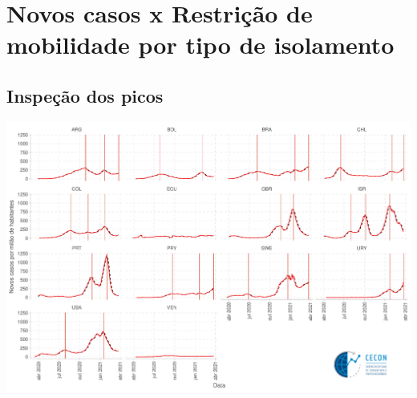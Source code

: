 \documentclass{SelfArx}
\begin{document}
\section*{Novos casos x Restrição de mobilidade por tipo de isolamento}
\label{sec:orgaf76eae}
\subsection*{Inspeção dos picos}
\label{sec:org5680740}

\begin{center}
\includegraphics[width=.9\linewidth]{./figs/COVID/Picos.pdf}
\end{center}
\end{document}
